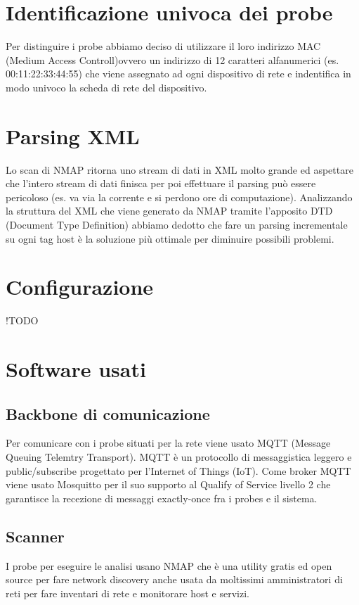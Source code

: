 \documentclass[target=bach,aauheader=,style=]{thud}
\begin{document}
\section{Identificazione univoca dei probe}
Per distinguire i probe abbiamo deciso di utilizzare il loro indirizzo MAC (Medium Access Controll)ovvero un indirizzo di 12 caratteri alfanumerici (es. 00:11:22:33:44:55) che viene assegnato ad ogni dispositivo di rete e indentifica in modo univoco la scheda di rete del dispositivo.

\section{Parsing XML}
Lo scan di NMAP ritorna uno stream di dati in XML molto grande ed aspettare che l'intero stream di dati finisca per poi effettuare il parsing può essere pericoloso (es. va via la corrente e si perdono ore di computazione). Analizzando la struttura del XML che viene generato da NMAP tramite l'apposito DTD (Document Type Definition) abbiamo dedotto che fare un parsing incrementale su ogni tag host è la soluzione più ottimale per diminuire possibili problemi.

\section{Configurazione}
!TODO

\section{Software usati}

\subsection{Backbone di comunicazione}
Per comunicare con i probe situati per la rete viene usato MQTT (Message Queuing Telemtry Transport). 
MQTT è un protocollo di messaggistica leggero e public/subscribe progettato per l'Internet of Things (IoT).
Come broker MQTT viene usato Mosquitto per il suo supporto al Qualify of Service livello 2 che garantisce la recezione di messaggi exactly-once fra i probes e il sistema.

\subsection{Scanner}
I probe per eseguire le analisi usano NMAP che è una utility gratis ed open source per fare network discovery anche usata da moltissimi amministratori di reti per fare inventari di rete e monitorare host e servizi. 
\end{document}
